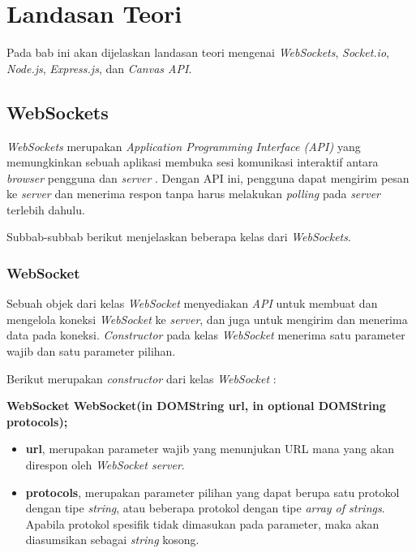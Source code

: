 \chapter{Landasan Teori}
\label{chap:teori}

Pada bab ini akan dijelaskan landasan teori mengenai \textit{WebSockets}, \textit{Socket.io}, \textit{Node.js}, \textit{Express.js}, dan \textit{Canvas API}.

\section{WebSockets}
\label{sec:WebSockets} 

\textit{WebSockets} merupakan \textit{Application Programming Interface (API)} yang memungkinkan sebuah aplikasi membuka sesi komunikasi interaktif antara \textit{browser} pengguna dan \textit{server} \cite{websockets}. Dengan API ini, pengguna dapat mengirim pesan ke \textit{server} dan menerima respon tanpa harus melakukan \textit{polling} pada \textit{server} terlebih dahulu.

Subbab-subbab berikut menjelaskan beberapa kelas dari \textit{WebSockets}.

\subsection{WebSocket}
Sebuah objek dari kelas \textit{WebSocket} menyediakan \textit{API} untuk membuat dan mengelola koneksi \textit{WebSocket} ke \textit{server}, dan juga untuk mengirim dan menerima data pada koneksi. \textit{Constructor} pada kelas \textit{WebSocket} menerima satu parameter wajib dan satu parameter pilihan. 

Berikut merupakan \textit{constructor} dari kelas \textit{WebSocket} : 

\textbf{WebSocket WebSocket(in DOMString url, in optional DOMString protocols);}
\begin{itemize}
	\item \textbf{url}, merupakan parameter wajib yang menunjukan URL mana yang akan direspon oleh \textit{WebSocket server}.
	
	\item \textbf{protocols}, merupakan parameter pilihan yang dapat berupa satu protokol dengan tipe \textit{string}, atau beberapa protokol dengan tipe \textit{array of strings}. Apabila protokol spesifik tidak dimasukan pada parameter, maka akan diasumsikan sebagai \textit{string} kosong.
	
\end{itemize}

